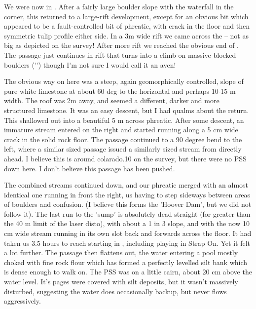 We were now in . After a fairly large boulder slope with the waterfall in the corner, this returned to a large-rift development, except for an obvious bit which appeared to be a fault-controlled bit of phreatic, with crack in the floor and then symmetric tulip profile either side. In a 3m wide rift we came across the  -- not as big as depicted on the survey!
After more rift we reached the obvious end of . The passage just continues in rift that turns into a climb on massive blocked boulders ('') though I'm not sure I would call it an aven!

The obvious way on here was a steep, again geomorphically controlled, slope of pure white limestone at about 60 deg to the horizontal and perhaps 10-15 m width. The roof was 2m away, and seemed a different, darker and more structured limestone. It was an easy descent, but I had qualms about the return.
This shallowed out into a beautiful 5 m across phreatic. After some descent, an immature stream entered on the right and started running along a 5 cm wide crack in the solid rock floor. The passage continued to a 90 degree bend to the left, where a similar sized passage issued a similarly sized stream from directly ahead. I believe this is around colarado.10 on the survey, but there were no PSS down here. I don't believe this passage has been pushed.

The combined streams continued down, and our phreatic merged with an almost identical one running in front the right, us having to step sideways between areas of boulders and confusion. (I believe this forms the 'Hoover Dam', but we did not follow it).
The last run to the 'sump' is absolutely dead straight (for greater than the 40 m limit of the laser disto), with about a 1 in 3 slope, and with the now 10 cm wide stream running in its own slot back and forwards across the floor. It had taken us 3.5 hours to reach  starting in , including playing in Strap On. Yet it felt a lot further.
The passage then flattens out, the water entering a pool mostly choked with fine rock flour which has formed a perfectly levelled silt bank which is dense enough to walk on. The PSS was on a little cairn, about 20 cm above the water level. It's pages were covered with silt deposits, but it wasn't massively disturbed, suggesting the water does occasionally backup, but never flows aggressively.

